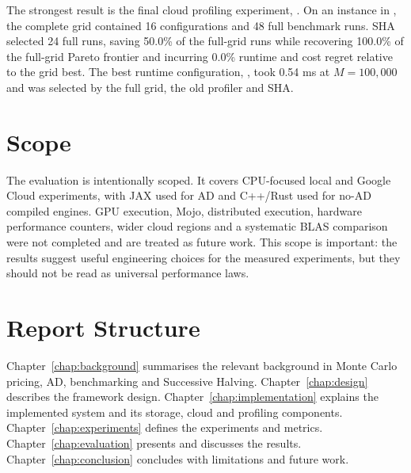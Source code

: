 The strongest result is the final cloud profiling experiment, . On an  instance in , the complete grid contained 16 configurations and 48 full benchmark runs. SHA selected 24 full runs, saving 50.0\% of the full-grid runs while recovering 100.0\% of the full-grid Pareto frontier and incurring 0.0\% runtime and cost regret relative to the grid best. The best runtime configuration, , took 0.54 ms at \(M=100{,}000\) and was selected by the full grid, the old profiler and SHA.

\section{Scope}

The evaluation is intentionally scoped. It covers CPU-focused local and Google Cloud experiments, with JAX used for AD and C++/Rust used for no-AD compiled engines. GPU execution, Mojo, distributed execution, hardware performance counters, wider cloud regions and a systematic BLAS comparison were not completed and are treated as future work. This scope is important: the results suggest useful engineering choices for the measured experiments, but they should not be read as universal performance laws.

\section{Report Structure}

Chapter~\ref{chap:background} summarises the relevant background in Monte Carlo pricing, AD, benchmarking and Successive Halving. Chapter~\ref{chap:design} describes the framework design. Chapter~\ref{chap:implementation} explains the implemented system and its storage, cloud and profiling components. Chapter~\ref{chap:experiments} defines the experiments and metrics. Chapter~\ref{chap:evaluation} presents and discusses the results. Chapter~\ref{chap:conclusion} concludes with limitations and future work.
